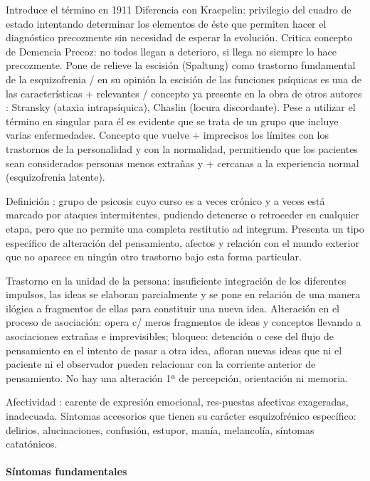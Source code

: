 Introduce el término en 1911 Diferencia con Kraepelin: privilegio del cuadro de estado intentando determinar los elementos de éste que permiten hacer el diagnóstico precozmente sin necesidad de esperar la evolución. Critica concepto de Demencia Precoz: no todos llegan a deterioro, si llega no siempre lo hace precozmente. Pone de relieve la escisión (Spaltung) como trastorno fundamental de la esquizofrenia / en su opinión la escisión de las funciones psíquicas es una de las características + relevantes / concepto ya presente en la obra de otros autores : Stransky (ataxia intrapsíquica), Chaslin (locura discordante). Pese a utilizar el término en singular para él es evidente que se trata de un grupo que incluye varias enfermedades. Concepto que vuelve + imprecisos los límites con los trastornos de la personalidad y con la normalidad, permitiendo que los pacientes sean considerados personas menos extrañas y + cercanas a la experiencia normal (esquizofrenia latente).

Definición : grupo de psicosis cuyo curso es a veces crónico y a veces está marcado por ataques intermitentes, pudiendo detenerse o retroceder en cualquier etapa, pero que no permite una completa restitutio ad integrum. Presenta un tipo específico de alteración del pensamiento, afectos y relación con el mundo exterior que no aparece en ningún otro trastorno bajo esta forma particular.

Trastorno en la unidad de la persona: insuficiente integración de los diferentes impulsos, las ideas se elaboran parcialmente y se pone en relación de una manera ilógica a fragmentos de ellas para constituir una nueva idea. Alteración en el proceso de asociación: opera c/ meros fragmentos de ideas y conceptos llevando a asociaciones extrañas e imprevisibles; bloqueo: detención o cese del flujo de pensamiento en el intento de pasar a otra idea, afloran nuevas ideas que ni el paciente ni el observador pueden relacionar con la corriente anterior de pensamiento. No hay una alteración 1ª de percepción, orientación ni memoria.

Afectividad : carente de expresión emocional, res-puestas afectivas exageradas, inadecuada. Síntomas accesorios que tienen su carácter esquizofrénico específico: delirios, alucinaciones, confusión, estupor, manía, melancolía, síntomas catatónicos.

\paragraph*{Síntomas fundamentales}

